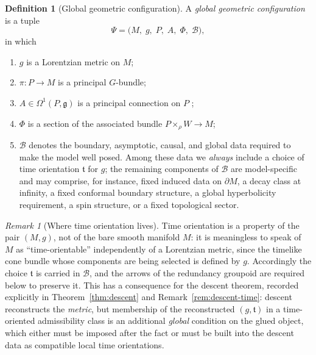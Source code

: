\documentclass[11pt,a4paper]{article}
\theoremstyle{plain}
\theoremstyle{definition}
\newtheorem{definition}[theorem]{Definition}
\theoremstyle{remark}
\newtheorem{remark}[theorem]{Remark}
\newcommand{\gfrak}{\mathfrak{g}}
\begin{document}
\begin{definition}[Global geometric configuration]
\label{def:config}
A \emph{global geometric configuration} is a tuple
\begin{equation}
\label{eq:config}
\Psi=\bigl(M,\;g,\;P,\;A,\;\Phi,\;\mathcal{B}\bigr),
\end{equation}
in which
\begin{enumerate}[label=(\alph*),leftmargin=2.2em]
\item $g$ is a Lorentzian metric on $M$;
\item $\pi\colon P\to M$ is a principal $G$-bundle;
\item $A\in\Omega^1(P,\gfrak)$ is a principal connection on $P$
      \cite{KobayashiNomizu1,Bleecker};
\item $\Phi$ is a section of the associated bundle $P\times_\rho W\to M$;
\item $\mathcal{B}$ denotes the boundary, asymptotic, causal, and global data required to make
      the model well posed. Among these data we \emph{always} include a choice of time
      orientation $\mathfrak{t}$ for $g$; the remaining components of $\mathcal{B}$ are
      model-specific and may comprise, for instance, fixed induced data on $\partial M$, a decay
      class at infinity, a fixed conformal boundary structure, a global hyperbolicity
      requirement, a spin structure, or a fixed topological sector.
\end{enumerate}
\end{definition}

\begin{remark}[Where time orientation lives]
\label{rem:time-orientation}
Time orientation is a property of the pair $(M,g)$, not of the bare smooth manifold $M$: it is
meaningless to speak of $M$ as ``time-orientable'' independently of a Lorentzian metric, since
the timelike cone bundle whose components are being selected is defined by $g$. Accordingly the
choice $\mathfrak{t}$ is carried in $\mathcal{B}$, and the arrows of the redundancy groupoid are
required below to preserve it. This has a consequence for the descent theorem, recorded
explicitly in Theorem~\ref{thm:descent} and Remark~\ref{rem:descent-time}: descent reconstructs
the \emph{metric}, but membership of the reconstructed $(g,\mathfrak{t})$ in a time-oriented
admissibility class is an additional \emph{global} condition on the glued object, which either
must be imposed after the fact or must be built into the descent data as compatible local time
orientations.
\end{remark}
\end{document}
